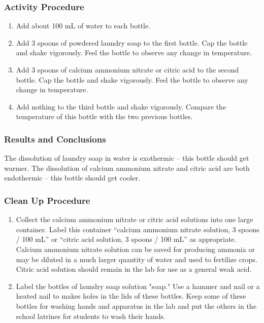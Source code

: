\subsubsection*{Activity Procedure}
\begin{enumerate}
\item{Add about 100 mL of water to each bottle.}
\item{Add 3 spoons of powdered laundry soap to the first bottle. Cap the bottle and shake vigorously. Feel the bottle to observe any change in temperature.}
\item{Add 3 spoons of calcium ammonium nitrate or citric acid to the second bottle. Cap the bottle and shake vigorously. Feel the bottle to observe any change in temperature.}
\item{Add nothing to the third bottle and shake vigorously. Compare the temperature of this bottle with the two previous bottles.}
\end{enumerate}

\subsubsection*{Results and Conclusions}
The dissolution of laundry soap in water is exothermic -- this bottle should get warmer. The dissolution of calcium ammonium nitrate and citric acid are both endothermic -- this bottle should get cooler.

\subsubsection*{Clean Up Procedure}
\begin{enumerate}
\item{Collect the calcium ammonium nitrate or citric acid solutions into one large container. Label this container ``calcium ammonium nitrate solution, 3 spoons / 100 mL'' or ``citric acid solution, 3 spoons / 100 mL'' as appropriate. Calcium ammonium nitrate solution can be saved for producing ammonia or may be diluted in a much larger quantity of water and used to fertilize crops. Citric acid solution should remain in the lab for use as a general weak acid.}
\item{Label the bottles of laundry soap solution "soap." Use a hammer and nail or a heated nail to makes holes in the lids of these bottles. Keep some of these bottles for washing hands and apparatus in the lab and put the others in the school latrines for students to wash their hands.}
\end{enumerate}

